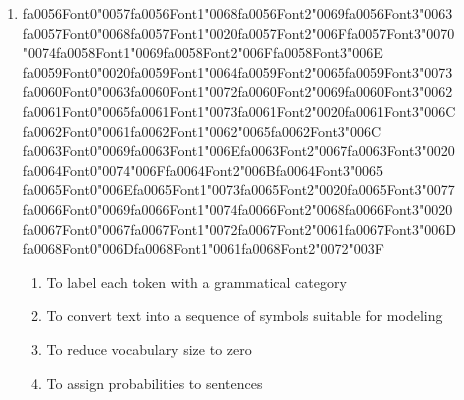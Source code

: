 \documentclass[12pt]{article}
\begin{document}
\begin{enumerate}[label=Q\arabic*.]
\begin{enumerate}[label=(\Alph*)]
\end{enumerate}
\item {\csname fa0056Font0\endcsname\char"0057}{\csname fa0056Font1\endcsname\char"0068}{\csname fa0056Font2\endcsname\char"0069}{\csname fa0056Font3\endcsname\char"0063} {\csname fa0057Font0\endcsname\char"0068}{\csname fa0057Font1\endcsname\char"0020}{\csname fa0057Font2\endcsname\char"006F}{\csname fa0057Font3\endcsname\char"0070} {\char"0074}{\csname fa0058Font1\endcsname\char"0069}{\csname fa0058Font2\endcsname\char"006F}{\csname fa0058Font3\endcsname\char"006E} {\csname fa0059Font0\endcsname\char"0020}{\csname fa0059Font1\endcsname\char"0064}{\csname fa0059Font2\endcsname\char"0065}{\csname fa0059Font3\endcsname\char"0073} {\csname fa0060Font0\endcsname\char"0063}{\csname fa0060Font1\endcsname\char"0072}{\csname fa0060Font2\endcsname\char"0069}{\csname fa0060Font3\endcsname\char"0062} {\csname fa0061Font0\endcsname\char"0065}{\csname fa0061Font1\endcsname\char"0073}{\csname fa0061Font2\endcsname\char"0020}{\csname fa0061Font3\endcsname\char"006C} {\csname fa0062Font0\endcsname\char"0061}{\csname fa0062Font1\endcsname\char"0062}{\char"0065}{\csname fa0062Font3\endcsname\char"006C} {\csname fa0063Font0\endcsname\char"0069}{\csname fa0063Font1\endcsname\char"006E}{\csname fa0063Font2\endcsname\char"0067}{\csname fa0063Font3\endcsname\char"0020} {\csname fa0064Font0\endcsname\char"0074}{\char"006F}{\csname fa0064Font2\endcsname\char"006B}{\csname fa0064Font3\endcsname\char"0065} {\csname fa0065Font0\endcsname\char"006E}{\csname fa0065Font1\endcsname\char"0073}{\csname fa0065Font2\endcsname\char"0020}{\csname fa0065Font3\endcsname\char"0077} {\csname fa0066Font0\endcsname\char"0069}{\csname fa0066Font1\endcsname\char"0074}{\csname fa0066Font2\endcsname\char"0068}{\csname fa0066Font3\endcsname\char"0020} {\csname fa0067Font0\endcsname\char"0067}{\csname fa0067Font1\endcsname\char"0072}{\csname fa0067Font2\endcsname\char"0061}{\csname fa0067Font3\endcsname\char"006D} {\csname fa0068Font0\endcsname\char"006D}{\csname fa0068Font1\endcsname\char"0061}{\csname fa0068Font2\endcsname\char"0072}{\char"003F}
\begin{enumerate}[label=(\Alph*)]
    \item To label each token with a grammatical category
    \item To convert text into a sequence of symbols suitable for modeling
    \item To reduce vocabulary size to zero
    \item To assign probabilities to sentences
\end{enumerate}

\end{enumerate}
\end{document}
